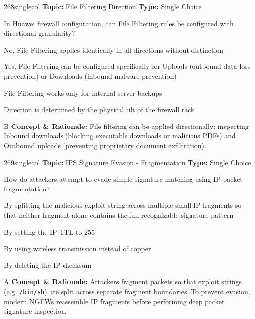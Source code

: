 \begin{qcard}{268}{singlecol}
\textcolor{darkslate!75}{\small\textbf{Topic:} File Filtering Direction \hfill \textbf{Type:} Single Choice}\vspace{0.4em}\par
In Huawei firewall configuration, can File Filtering rules be configured with directional granularity?
\begin{qoptions}
\item No, File Filtering applies identically in all directions without distinction
\item Yes, File Filtering can be configured specifically for Uploads (outbound data loss prevention) or Downloads (inbound malware prevention)
\item File Filtering works only for internal server backups
\item Direction is determined by the physical tilt of the firewall rack
\end{qoptions}
\end{qcard}
\nopagebreak
\begin{explainbox}{B}
\textbf{Concept \& Rationale:} File filtering can be applied directionally: inspecting Inbound downloads (blocking executable downloads or malicious PDFs) and Outbound uploads (preventing proprietary document exfiltration).
\end{explainbox}

\begin{qcard}{269}{singlecol}
\textcolor{darkslate!75}{\small\textbf{Topic:} IPS Signature Evasion - Fragmentation \hfill \textbf{Type:} Single Choice}\vspace{0.4em}\par
How do attackers attempt to evade simple signature matching using IP packet fragmentation?
\begin{qoptions}
\item By splitting the malicious exploit string across multiple small IP fragments so that neither fragment alone contains the full recognizable signature pattern
\item By setting the IP TTL to 255
\item By using wireless transmission instead of copper
\item By deleting the IP checksum
\end{qoptions}
\end{qcard}
\nopagebreak
\begin{explainbox}{A}
\textbf{Concept \& Rationale:} Attackers fragment packets so that exploit strings (e.g. \texttt{/bin/sh}) are split across separate fragment boundaries. To prevent evasion, modern NGFWs reassemble IP fragments before performing deep packet signature inspection.
\end{explainbox}

